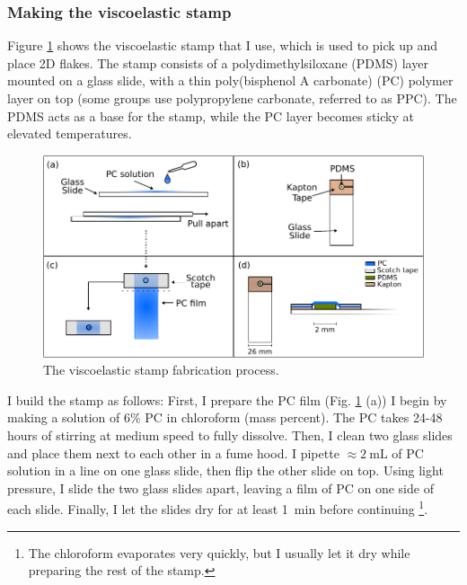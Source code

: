 \documentclass[double,12pt,1in]{beavtex}
\begin{document}
\subsubsection{Making the viscoelastic stamp} \label{making the PC stamp section}

Figure \ref{stamp diagram} shows the viscoelastic stamp that I use, which is used to pick up and place 2D flakes. The stamp consists of a polydimethylsiloxane (PDMS) layer mounted on a glass slide, with a thin poly(bisphenol A carbonate) (PC) polymer layer on top (some groups use polypropylene carbonate, referred to as PPC). The PDMS acts as a base for the stamp, while the PC layer becomes sticky at elevated temperatures.


\begin{figure}
    \includegraphics[width = 1\textwidth]{stamp making diagram.pdf}
    \caption{The viscoelastic stamp fabrication process.}
    \label{stamp diagram}
\end{figure}


I build the stamp as follows: First, I prepare the PC film (Fig. \ref{stamp diagram} (a)) I begin by making a solution of 6\% PC in chloroform (mass percent). The PC takes 24-48 hours of stirring at medium speed to fully dissolve. Then, I clean two glass slides and place them next to each other in a fume hood. I pipette $\approx \SI{2}{\milli\liter}$ of PC solution in a line on one glass slide, then flip the other slide on top. Using light pressure, I slide the two glass slides apart, leaving a film of PC on one side of each slide. Finally, I let the slides dry for at least \SI{1}{\minute} before continuing \footnote{The chloroform evaporates very quickly, but I usually let it dry while preparing the rest of the stamp.}.
\end{document}
